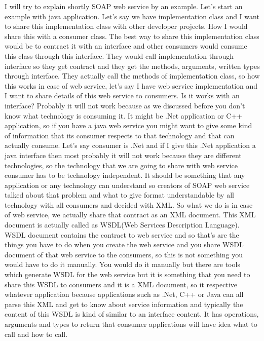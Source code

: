 I will try to explain shortly SOAP web service by an example. Let’s start an example with java application. Let’s say we have
implementation class and I want to share this implementation class with other developer projects. How I would share this with a
consumer class. The best way to share this implementation class would be to contract it with an interface and other consumers
would consume this class through this interface. They would call implementation through interface so they get contract and they
get the methods, arguments, written types through interface. They actually call the methods of implementation class, so how this
works in case of web service, let’s say I have web service implementation and I want to share details of this web service to
consumers. Is it works with an interface? Probably it will not work because as we discussed before you don’t know what technology
is consuming it. It might be .Net application or C++ application, so if you have a java web service you might want to give some
kind of information that its consumer respects to that technology and that can actually consume. Let’s say consumer is .Net and if I give this .Net
application a java interface then most probably it will not work because they are different technologies, so the technology
that we are going to share with web service consumer has to be technology independent. It should be something that any
application or any technology can understand so creators of SOAP web service talked about that problem and what to give format
understandable by all technology with all consumers and decided with XML. So what we do is in case of web service, we
actually share that contract as an XML document. This XML document is actually called as WSDL(Web Services Description Language)\citep{thesis:state2}.\\

WSDL document contains the contract to web service and so that’s are the things you have to do when you create the web
service and you share WSDL document of that web service to the consumers, so this is not something you would have to do
it manually. You would do it manually but there are tools which generate WSDL for the web service but it is something that
you need to share this WSDL to consumers and it is a XML document, so it respective whatever application because applications
such as .Net, C++ or Java can all parse this XML\citep{thesis:state3} and get to know about service information and typically the content of
this WSDL is kind of similar to an interface content. It has operations, arguments and types  to return that consumer
applications will have idea what to call and how to call.\\

